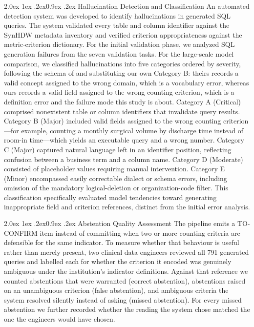 \documentclass[10pt]{article}
\makeatletter
\renewcommand\subsection{\@startsection{subsection}{2}{\z@}%
  {2.0ex \@plus 1ex \@minus .2ex}{0.9ex \@plus .2ex}%
  {\normalfont\normalsize\bfseries}}
\makeatother
\begin{document}
\subsection{Hallucination Detection and Classification}
An automated detection system was developed to identify hallucinations in
generated SQL queries. The system validated every table and column identifier
against the SynHDW metadata inventory and verified criterion appropriateness
against the metric-criterion dictionary. For the initial validation phase, we
analyzed SQL generation failures from the seven validation tasks. For the
large-scale model comparison, we classified hallucinations into five categories
ordered by severity, following the schema of \cite{lee2025} and substituting our
own Category B: theirs records a valid concept assigned to the wrong domain, which
is a vocabulary error, whereas ours records a valid field assigned to the wrong
counting criterion, which is a definition error and the failure mode this study is
about. Category A (Critical) comprised
nonexistent table or column identifiers that invalidate query results. Category
B (Major) included valid fields assigned to the wrong counting criterion---for
example, counting a monthly surgical volume by discharge time instead of room-in
time---which yields an executable query and a wrong number. Category C (Major)
captured natural language left in an identifier position, reflecting confusion
between a business term and a column name. Category D (Moderate) consisted of
placeholder values requiring manual intervention. Category E (Minor) encompassed
easily correctable dialect or schema errors, including omission of the mandatory
logical-deletion or organization-code filter. This classification specifically
evaluated model tendencies toward generating inappropriate field and criterion
references, distinct from the initial error analysis.

\subsection{Abstention Quality Assessment}
The pipeline emits a TO-CONFIRM item instead of committing when two or more
counting criteria are defensible for the same indicator. To measure whether that
behaviour is useful rather than merely present, two clinical data engineers
reviewed all 791 generated queries and labelled each for whether the criterion it
encoded was genuinely ambiguous under the institution's indicator definitions.
Against that reference we counted abstentions that were warranted (correct
abstention), abstentions raised on an unambiguous criterion (false abstention),
and ambiguous criteria the system resolved silently instead of asking (missed
abstention). For every missed abstention we further recorded whether the reading
the system chose matched the one the engineers would have chosen.
\end{document}
